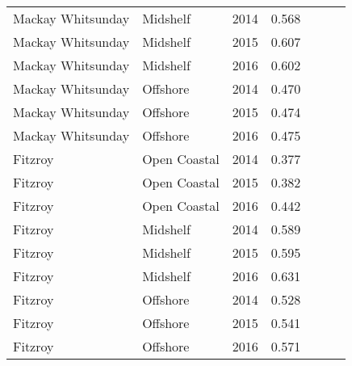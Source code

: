 {\begin{longtable}{llccccc}
  Mackay Whitsunday & Midshelf & 2014 & 0.568 & \cellcolor[HTML]{F0C918}{C} & \cellcolor[HTML]{F0C918}{C} & \cellcolor[HTML]{F0C918}{C} \\ 
  Mackay Whitsunday & Midshelf & 2015 & 0.607 & \cellcolor[HTML]{F0C918}{C} & \cellcolor[HTML]{B0D235}{B} & \cellcolor[HTML]{F0C918}{C} \\ 
  Mackay Whitsunday & Midshelf & 2016 & 0.602 & \cellcolor[HTML]{F0C918}{C} & \cellcolor[HTML]{B0D235}{B} & \cellcolor[HTML]{F0C918}{C} \\ 
  Mackay Whitsunday & Offshore & 2014 & 0.470 & \cellcolor[HTML]{F47721}{D} & \cellcolor[HTML]{F0C918}{C} & \cellcolor[HTML]{F47721}{D} \\ 
  Mackay Whitsunday & Offshore & 2015 & 0.474 & \cellcolor[HTML]{F47721}{D} & \cellcolor[HTML]{F0C918}{C} & \cellcolor[HTML]{F47721}{D} \\ 
  Mackay Whitsunday & Offshore & 2016 & 0.475 & \cellcolor[HTML]{F47721}{D} & \cellcolor[HTML]{F0C918}{C} & \cellcolor[HTML]{F47721}{D} \\ 
  Fitzroy & Open Coastal & 2014 & 0.377 & \cellcolor[HTML]{F47721}{D} & \cellcolor[HTML]{F47721}{D} & \cellcolor[HTML]{F47721}{D} \\ 
  Fitzroy & Open Coastal & 2015 & 0.382 & \cellcolor[HTML]{F47721}{D} & \cellcolor[HTML]{F47721}{D} & \cellcolor[HTML]{F47721}{D} \\ 
  Fitzroy & Open Coastal & 2016 & 0.442 & \cellcolor[HTML]{F47721}{D} & \cellcolor[HTML]{F0C918}{C} & \cellcolor[HTML]{F47721}{D} \\ 
  Fitzroy & Midshelf & 2014 & 0.589 & \cellcolor[HTML]{F0C918}{C} & \cellcolor[HTML]{F0C918}{C} & \cellcolor[HTML]{F0C918}{C} \\ 
  Fitzroy & Midshelf & 2015 & 0.595 & \cellcolor[HTML]{F0C918}{C} & \cellcolor[HTML]{F0C918}{C} & \cellcolor[HTML]{F0C918}{C} \\ 
  Fitzroy & Midshelf & 2016 & 0.631 & \cellcolor[HTML]{F0C918}{C} & \cellcolor[HTML]{B0D235}{B} & \cellcolor[HTML]{F0C918}{C} \\ 
  Fitzroy & Offshore & 2014 & 0.528 & \cellcolor[HTML]{F0C918}{C} & \cellcolor[HTML]{F0C918}{C} & \cellcolor[HTML]{F0C918}{C} \\ 
  Fitzroy & Offshore & 2015 & 0.541 & \cellcolor[HTML]{F0C918}{C} & \cellcolor[HTML]{F0C918}{C} & \cellcolor[HTML]{F0C918}{C} \\ 
  Fitzroy & Offshore & 2016 & 0.571 & \cellcolor[HTML]{F0C918}{C} & \cellcolor[HTML]{F0C918}{C} & \cellcolor[HTML]{F0C918}{C} \\ 

\end{longtable}}
